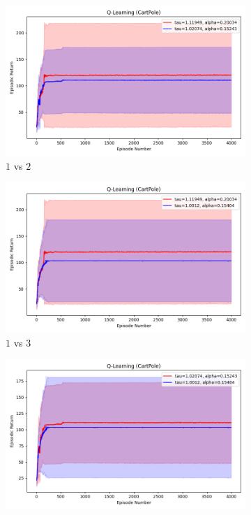 \documentclass[11pt, a4]{article}
\begin{document}
					\begin{figure}[H]
						\centering
						\begin{subfigure}{.7\textwidth}
							\centering
							\includegraphics[width=\textwidth]{../cartpole-v1/plots/qlearning_Figure_1.png}
							\caption{$1$ vs $2$}
							\label{fig:qlearningcartpole1vs2}
						\end{subfigure}
						\hfill
						\begin{subfigure}{.7\textwidth}
							\centering
							\includegraphics[width=\textwidth]{../cartpole-v1/plots/qlearning_Figure_2.png}
							\caption{$1$ vs $3$}
							\label{fig:qlearningcartpole1vs3}
						\end{subfigure}
						\hfill
						\begin{subfigure}{.7\textwidth}
							\centering
							\includegraphics[width=\textwidth]{../cartpole-v1/plots/qlearning_Figure_3.png}

\end{subfigure}
\end{figure}
\end{document}
